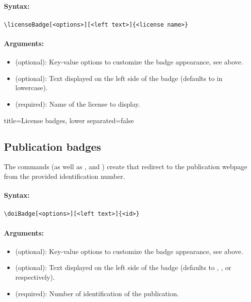 \paragraph{Syntax:}
\begin{verbatim}
\licenseBadge[<options>][<left text>]{<license name>}
\end{verbatim}

\paragraph{Arguments:}
\begin{itemize}
    \item \mintex{[<options>]} (optional): Key-value options to customize the badge appearance, see above.
    \item {} (optional): Text displayed on the left side of the badge (defaults to  in lowercase).
    \item {} (required): Name of the license to display.
\end{itemize}


\begin{tcblisting}{title={License badges}, lower separated=false}
\end{tcblisting}


\subsection{Publication badges}

The commands \mintex{\doiBadge} (as well as \mintex{\arxivBadge}, \mintex{\halBadge} and \mintex{\pubmedBadge}) create that redirect to the publication webpage from the provided identification number.

\paragraph{Syntax:}
\begin{verbatim}
\doiBadge[<options>][<left text>]{<id>}
\end{verbatim}

\paragraph{Arguments:}
\begin{itemize}
    \item \mintex{[<options>]} (optional): Key-value options to customize the badge appearance, see above.
    \item {} (optional): Text displayed on the left side of the badge (defaults to , ,  or  respectively).
    \item {} (required): Number of identification of the publication.
\end{itemize}

